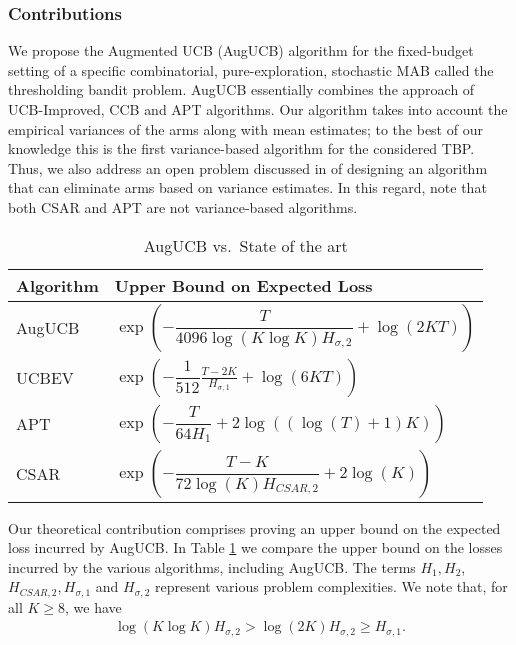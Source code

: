\documentclass[MS,synopsis]{iitmdiss}
\begin{document}
\subsubsection{Contributions}

We propose the Augmented UCB (AugUCB) algorithm for the fixed-budget setting of a specific combinatorial, pure-exploration, stochastic MAB called the thresholding bandit problem. AugUCB essentially combines the approach of UCB-Improved, CCB \citep{liu2016modification} and APT \citep{locatelli2016optimal} algorithms. Our algorithm takes into account the empirical variances of the arms along with mean estimates; to the best of our knowledge this is the first variance-based algorithm for the considered TBP. 
Thus, we also address an open problem discussed in \cite{auer2010ucb} of designing an algorithm that can eliminate arms based on variance estimates. In this regard, note that both CSAR \citep{chen2014combinatorial} and APT are not variance-based algorithms. 

\begin{table}[b]
\caption{AugUCB vs.\ State of the art}
\label{tab:regret-bds}
\begin{center}
\begin{tabular}{|p{2.3cm}|p{8.4cm}|}
\hline
Algorithm  & Upper Bound on Expected Loss \\
\hline
\hline
AugUCB      &$ \exp\left(- \dfrac{T}{4096 \log(K\log K)H_{\sigma,2}} + \log\left(2KT\right) \right) $ \\
\hline
\hline
UCBEV		&$\exp\left(-\dfrac{1}{512}\frac{T-2K}{H_{\sigma,1}} + \log\left(6KT\right)\right)$ \\
\hline
\hline
APT         &$\exp\left(-\dfrac{T}{64 H_1}+2\log((\log(T)+1)K)\right)$ \\
\hline
\hline
CSAR		&$\exp\left(-\dfrac{T-K}{72\log(K)H_{CSAR,2}}+2\log(K)\right)$ \\
\hline
\end{tabular}
\end{center}
\end{table}

Our theoretical contribution comprises proving an upper bound on the expected loss incurred by AugUCB. In Table \ref{tab:regret-bds} we compare the upper bound on the losses incurred by the various algorithms, including AugUCB. The terms $H_1, H_2$, $H_{CSAR,2}, H_{\sigma,1}$ and $H_{\sigma,2}$ represent various problem complexities. We note that, for all $K\ge 8$, we have
\begin{align*}
\log\left(K\log K\right) H_{\sigma,2} > \log(2K) H_{\sigma,2} \ge H_{\sigma,1}.
\end{align*}
\end{document}
